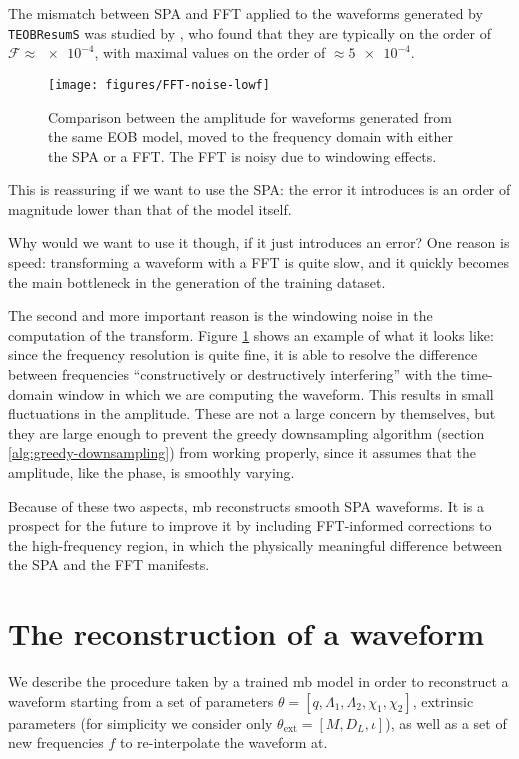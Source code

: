 \documentclass[main.tex]{subfiles}
\begin{document}
The mismatch between \ac{SPA} and \ac{FFT} applied to the waveforms generated by \texttt{TEOBResumS} was studied by \textcite{gambaFastFaithfulFrequencydomain2020}, who found that they are typically on the order of \(\mathcal{F} \approx \num{e-4}\), with maximal values on the order of \(\approx \num{5e-4}\). 

\begin{figure}[ht]
\centering
\texttt{[image: figures/FFT-noise-lowf]}
\caption{Comparison between the amplitude for waveforms generated from the same \ac{EOB} model, moved to the frequency domain with either the \ac{SPA} or a \ac{FFT}. The \ac{FFT} is noisy due to windowing effects.}
\label{fig:FFT-noise-lowf}
\end{figure}

This is reassuring if we want to use the \ac{SPA}: the error it introduces is an order of magnitude lower than that of the model itself. 

Why would we want to use it though, if it just introduces an error?
One reason is speed: transforming a waveform with a \ac{FFT} is quite slow, and it quickly becomes the main bottleneck in the generation of the training dataset.

The second and more important reason is the windowing noise in the computation of the transform.
Figure \ref{fig:FFT-noise-lowf} shows an example of what it looks like: since the frequency resolution is quite fine, it is able to resolve the difference between frequencies ``constructively or destructively interfering'' with the time-domain window in which we are computing the waveform. 
This results in small fluctuations in the amplitude. These are not a large concern by themselves, but they are large enough to prevent the greedy downsampling algorithm (section \ref{alg:greedy-downsampling}) from working properly, since it assumes that the amplitude, like the phase, is smoothly varying. 

Because of these two aspects, \ac{mb} reconstructs smooth \ac{SPA} waveforms. It is a prospect for the future to improve it by including \ac{FFT}-informed corrections to the high-frequency region, in which the physically meaningful difference between the \ac{SPA} and the \ac{FFT} manifests. 

\section{The reconstruction of a waveform}

We describe the procedure taken by a trained \ac{mb} model in order to reconstruct a waveform starting from a set of parameters \(\theta = [q, \Lambda_1 , \Lambda_2 , \chi_1 , \chi_2 ]\), extrinsic parameters (for simplicity we consider only \(\theta _{\text{ext}} = [M, D_L, \iota]\)), as well as a set of new frequencies \(f\) to re-interpolate the waveform at.
\end{document}
